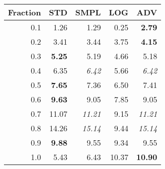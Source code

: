 \documentclass{standalone}
\begin{document}
\begin{tabular}{r|rrrr}
      \toprule
      Fraction & STD & SMPL & LOG & ADV\\
      \midrule
      0.1 & 1.26 & 1.29 & 0.25 & \textbf{2.79}\\
  0.2 & 3.41 & 3.44 & 3.75 & \textbf{4.15}\\
  0.3 & \textbf{5.25} & 5.19 & 4.66 & 5.18\\
  0.4 & 6.35 & \emph{6.42} & 5.66 & \emph{6.42}\\
  0.5 & \textbf{7.65} & 7.36 & 6.50 & 7.41\\
  0.6 & \textbf{9.63} & 9.05 & 7.85 & 9.05\\
  0.7 & 11.07 & \emph{11.21} & 9.15 & \emph{11.21}\\
  0.8 & 14.26 & \emph{15.14} & 9.44 & \emph{15.14}\\
  0.9 & \textbf{9.88} & 9.55 & 9.34 & 9.55\\
  1.0 & 5.43 & 6.43 & 10.37 & \textbf{10.90}\\
  \bottomrule
\end{tabular}
\end{document}
